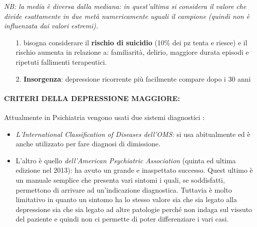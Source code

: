 \emph{NB: la media è diversa dalla mediana: in quest'ultima si considera
il valore che divide esattamente in due metà numericamente uguali il
campione (quindi non è influenzata dai valori estremi).}

\begin{itemize}
\item[1.]
  bisogna considerare il \textbf{rischio di suicidio} (10\% dei pz tenta
  e riesce) e il rischio aumenta in relazione a: familiarità, delirio,
  maggiore durata episodi e ripetuti fallimenti terapeutici.
\item[2.]
  \textbf{Insorgenza}: depressione ricorrente più facilmente compare
  dopo i 30 anni
\end{itemize}

\paragraph{CRITERI DELLA DEPRESSIONE MAGGIORE:}

Attualmente in Psichiatria vengono usati due sistemi diagnostici :

\begin{itemize}
\item
  \emph{\emph{L'International Classification of Diseases dell'OMS:}} si
  usa abitualmente ed è anche utilizzato per fare diagnosi di
  dimissione.
\item
  L'altro è quello \emph{\emph{dell'American Psychiatric Association}}
  (quinta ed ultima edizione nel 2013): ha avuto un grande e inaspettato
  successo. Quest ultimo è un manuale semplice che presenta vari sintomi
  i quali, se soddisfatti, permettono di arrivare ad un'indicazione
  diagnostica. Tuttavia è molto limitativo in quanto un sintomo ha lo
  stesso valore sia che sia legato alla depressione sia che sia legato
  ad altre patologie perché non indaga sul vissuto del paziente e quindi
  non ci permette di poter differenziare i vari casi.
\end{itemize}

